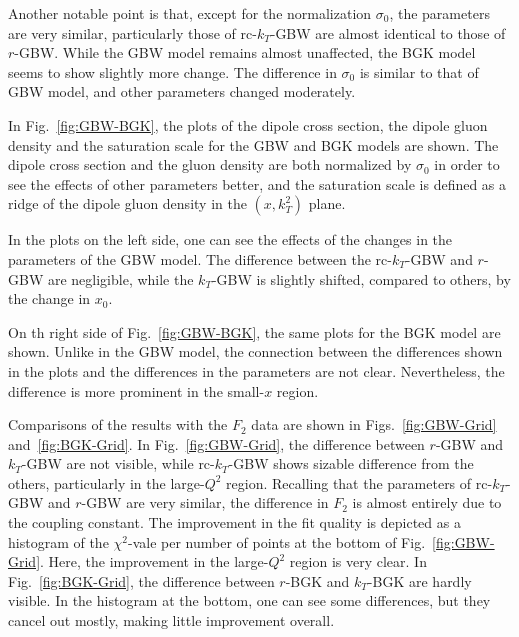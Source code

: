 \documentclass[11pt]{article}
\begin{document}
Another notable point is that, except for the normalization $\sigma_0$, the parameters are very similar, particularly those of rc-$k_T$-GBW are almost identical to those of $r$-GBW. 
While the GBW model remains almost unaffected, the BGK model seems to show slightly more change. The difference in $\sigma_0$ is similar to that of GBW model, and other parameters changed moderately.

In Fig.~\ref{fig:GBW-BGK}, the plots of the dipole cross section, the dipole
gluon density and the saturation scale for the GBW and BGK models are shown. The
dipole cross section and the gluon density are both normalized by $\sigma_0$ in
order to see the effects  of other parameters better, and the saturation scale
is defined as a ridge of the dipole gluon density in the $(x,k_T^2)$ plane.

In the plots on the left side, one can see the effects of the changes in the parameters of the GBW model. The difference between the rc-$k_T$-GBW and $r$-GBW are negligible, while the $k_T$-GBW is slightly shifted, compared to others, by the change in $x_0$.

On th right side of Fig.~\ref{fig:GBW-BGK}, the same plots for the BGK model are shown.
Unlike in the GBW model, the connection between the differences shown in the plots and the differences in the parameters are not clear. Nevertheless, the difference is more prominent in the small-$x$ region.

Comparisons of the results with the $F_2$ data are shown in Figs.~\ref{fig:GBW-Grid} and~\ref{fig:BGK-Grid}.
In Fig.~\ref{fig:GBW-Grid}, the difference between $r$-GBW and $k_T$-GBW are not visible, while rc-$k_T$-GBW shows sizable difference from the others, particularly in the large-$Q^2$ region. 
Recalling that the parameters of rc-$k_T$-GBW and $r$-GBW are very similar, the difference in $F_2$ is almost entirely due to the coupling constant. The improvement in the fit quality is depicted as a histogram of the $\chi^2$-vale per number of points at the bottom of Fig.~\ref{fig:GBW-Grid}. Here, the improvement in the large-$Q^2$ region is very clear.
In Fig.~\ref{fig:BGK-Grid}, the difference between $r$-BGK and $k_T$-BGK are hardly visible. In the histogram at the bottom, one can see some differences, but they cancel out mostly, making little improvement overall.
\end{document}
